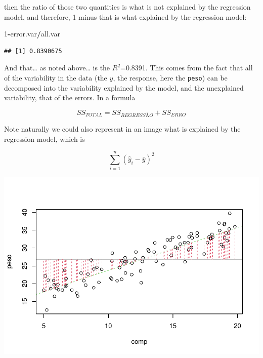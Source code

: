 \documentclass[
]{book}
\newenvironment{Shaded}{\begin{snugshade}}{\end{snugshade}}
\newcommand{\AttributeTok}[1]{\textcolor[rgb]{0.13,0.29,0.53}{#1}}
\newcommand{\CommentTok}[1]{\textcolor[rgb]{0.56,0.35,0.01}{\textit{#1}}}
\newcommand{\DecValTok}[1]{\textcolor[rgb]{0.00,0.00,0.81}{#1}}
\newcommand{\FunctionTok}[1]{\textcolor[rgb]{0.13,0.29,0.53}{\textbf{#1}}}
\newcommand{\NormalTok}[1]{#1}
\newcommand{\SpecialCharTok}[1]{\textcolor[rgb]{0.81,0.36,0.00}{\textbf{#1}}}
\begin{document}
then the ratio of those two quantities is what is not explained by the regression model, and therefore, 1 minus that is what explained by the regression model:

\begin{Shaded}
\begin{Highlighting}[]
\DecValTok{1}\SpecialCharTok{{-}}\NormalTok{error.var}\SpecialCharTok{/}\NormalTok{all.var}
\end{Highlighting}
\end{Shaded}

\begin{verbatim}
## [1] 0.8390675
\end{verbatim}

And that\ldots{} as noted above\ldots{} is the \(R^2\)=0.8391. This comes from the fact that all of the variability in the data (the \(y\), the response, here the \texttt{peso}) can be decomposed into the variability explained by the model, and the unexplained variability, that of the errors. In a formula

\[SS_{TOTAL}=SS_{REGRESSÃO}+SS_{ERRO}\]

Note naturally we could also represent in an image what is explained by the regression model, which is

\[\sum_{i=1}^n (\hat y_i- \bar y)^2\]

\begin{Shaded}
\end{Shaded}

\includegraphics{ECOMODbook_files/figure-latex/a6.18-1.pdf}
\end{document}
